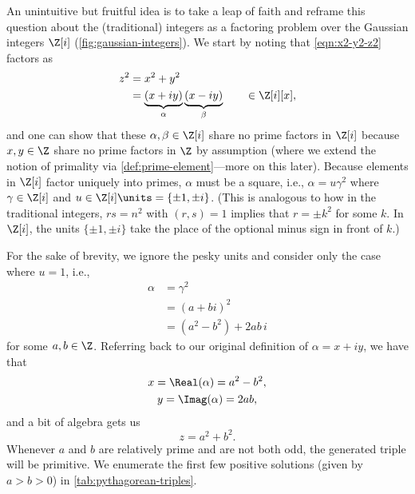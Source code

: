 An unintuitive but fruitful idea is to take a leap of faith and reframe this question about the (traditional) integers as a factoring problem over the Gaussian integers $\Z[i]$ (\autoref{fig:gaussian-integers}). We start by noting that \autoref{eqn:x2-y2-z2} factors as
\begin{equation}
    \begin{aligned}
        z^2 & = x^2 + y^2                                                                     \\
            & = \underbrace{(x + iy)}_\alpha \underbrace{(x - iy)}_\beta \qquad \in \Z[i][x],
    \end{aligned}
\end{equation}
and one can show that these $\alpha, \beta \in \Z[i]$ share no prime factors in $\Z[i]$ because $x, y \in \Z$ share no prime factors in $\Z$ by assumption (where we extend the notion of primality via \autoref{def:prime-element}---more on this later). Because elements in $\Z[i]$ factor uniquely into primes, $\alpha$ must be a square, i.e., $\alpha = u \gamma^2$ where $\gamma \in \Z[i]$ and $u \in \Z[i] \units = \{ \pm 1, \pm i \}$. (This is analogous to how in the traditional integers, $rs = n^2$ with $(r, s) = 1$ implies that $r = \pm k^2$ for some $k$. In $\Z[i]$, the units $\{ \pm 1, \pm i \}$ take the place of the optional minus sign in front of $k$.)

For the sake of brevity, we ignore the pesky units and consider only the case where $u = 1$, i.e.,
\begin{equation}
    \begin{aligned}
        \alpha & = \gamma^2              \\
               & = (a + bi)^2            \\
               & = (a^2 - b^2)+ 2ab \, i
    \end{aligned}
\end{equation}
for some $a, b \in \Z$. Referring back to our original definition of $\alpha = x + iy$, we have that
\begin{equation}
    \begin{gathered}
        x = \Real(\alpha) = a^2 - b^2, \\
        y = \Imag(\alpha) = 2ab, \\
    \end{gathered}
\end{equation}
and a bit of algebra gets us
\begin{equation}
    z =  a^2 + b^2.
\end{equation}
Whenever $a$ and $b$ are relatively prime and are not both odd, the generated triple will be primitive. We enumerate the first few positive solutions (given by $a > b > 0$) in \autoref{tab:pythagorean-triples}.

